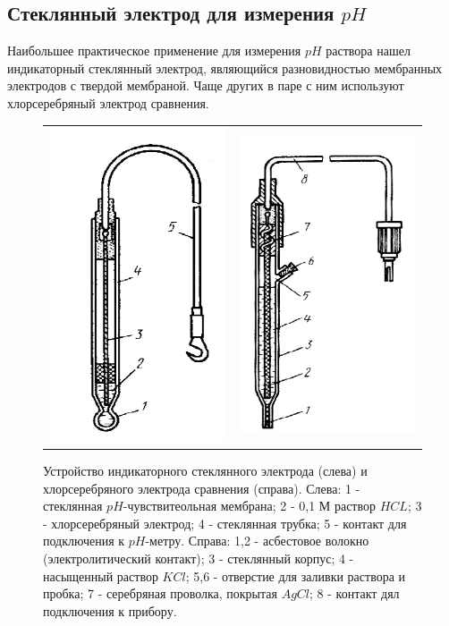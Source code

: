\documentclass[a4paper,12pt]{article} %
\begin{document}
\subsection{Стеклянный электрод для измерения $pH$}
Наибольшее практическое применение для измерения $pH$ раствора нашел индикаторный стеклянный электрод, являющийся разновидностью мембранных электродов с твердой мембраной. Чаще других в паре с ним используют хлорсеребряный электрод сравнения.

\begin{figure}[H]
\centering
\begin{tabular}{ll}
\includegraphics[width = 6cm]{pic1.png}
&
\includegraphics[width =6cm]{pic2.png}
\end{tabular}
\caption{Устройство индикаторного
стеклянного электрода (слева)
и хлорсеребряного
электрода сравнения (справа). Слева: 1 - стеклянная $pH$-чувствитеольная мембрана; 2 - 0,1 М раствор $HCL$; 3 - хлорсеребряный электрод; 4 - стеклянная трубка; 5 - контакт для подключения к $pH$-метру. Справа: 1,2 - асбестовое волокно (электролитический контакт); 3 - стеклянный корпус; 4 - насыщенный раствор $KCl$; 5,6 - отверстие для заливки раствора и пробка; 7 - серебряная проволка, покрытая $AgCl$; 8 - контакт дял подключения к прибору.}
\label{pic:000}
\end{figure}
\end{document}
